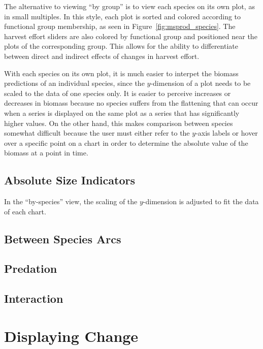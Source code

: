 The alternative to viewing ``by group'' is to view each species on its own plot, as in small multiples.  In this style, each plot is sorted and colored according to functional group membership, as seen in Figure~\ref{fig:msprod_species}.  The harvest effort sliders are also colored by functional group and positioned near the plots of the corresponding group.  This allows for the ability to differentiate between direct and indirect effects of changes in harvest effort.

With each species on its own plot, it is much easier to interpet the biomass predictions of an individual species, since the $y$-dimension of a plot needs to be scaled to the data of one species only.  It is easier to perceive increases or decreases in biomass because no species suffers from the flattening that can occur when a series is displayed on the same plot as a series that has significantly higher values.  On the other hand, this makes comparison between species somewhat difficult because the user must either refer to the $y$-axis labels or hover over a specific point on a chart in order to determine the absolute value of the biomass at a point in time.

\subsection{Absolute Size Indicators}

In the ``by-species'' view, the scaling of the $y$-dimension is adjusted to fit the data of each chart.

\subsection{Between Species Arcs}

\subsection{Predation}

\subsection{Interaction}

\section{Displaying Change}

